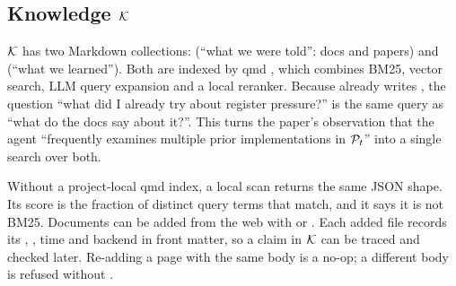\subsection{Knowledge \texorpdfstring{$\mathcal{K}$}{K}}
\label{sec:knowledge}

$\mathcal{K}$ has two Markdown collections:  (``what we were told'': docs and papers) and
 (``what we learned''). Both are indexed by qmd \citep{lutke2025qmd}, which combines BM25,
vector search, LLM query expansion and a local reranker. Because  already writes
, the question ``what did I already try about register pressure?'' is the same
query as ``what do the docs say about it?''. This turns the paper's observation that the agent
``frequently examines multiple prior implementations in $\mathcal{P}_t$'' into a single search over both.

Without a project-local qmd index, a local scan returns the same JSON shape. Its score is the
fraction of distinct query terms that match, and it says it is not BM25. Documents can be added from
the web with  or . Each added file records its
, ,  time and  backend in front matter, so a
claim in $\mathcal{K}$ can be traced and checked later. Re-adding a page with the same body is a no-op; a
different body is refused without .
